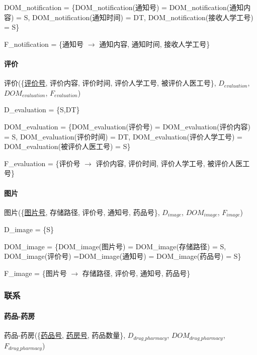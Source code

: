 \documentclass{article}
\begin{document}
DOM\_notification = \{DOM\_notification(通知号) = DOM\_notification(通知内容) = S, \newline DOM\_notification(通知时间) = DT, DOM\_notification(接收人学工号) = S\}

F\_notification = \{通知号 $\rightarrow$ 通知内容, 通知时间, 接收人学工号\}

\paragraph{评价}

评价(\{\underline{评价号}, 评价内容, 评价时间, 评价人学工号, 被评价人医工号\}, $D_{evaluation}$, \newline $DOM_{evaluation}$, $F_{evaluation}$)

D\_evaluation = \{S,DT\}

DOM\_evaluation = \{DOM\_evaluation(评价号) = DOM\_evaluation(评价内容) = S, \newline DOM\_evaluation(评价时间) = DT, DOM\_evaluation(评价人学工号) = DOM\_evaluation(被评价人医工号) = S\}

F\_evaluation = \{评价号 $\rightarrow$ 评价内容, 评价时间, 评价人学工号, 被评价人医工号\}

\paragraph{图片}

图片(\{\underline{图片号}, 存储路径, 评价号, 通知号, 药品号\}, $D_{image}$, $DOM_{image}$, $F_{image}$)

D\_image = \{S\}

DOM\_image = \{DOM\_image(图片号) = DOM\_image(存储路径) = S, DOM\_image(评价号) =\newline DOM\_image(通知号) = DOM\_image(药品号) = S\}

F\_image = \{图片号 $\rightarrow$ 存储路径, 评价号, 通知号, 药品号\}

\subsubsection{联系}

\paragraph{药品-药房}

药品-药房(\{\underline{药品号}, \underline{药房号}, 药品数量\}, $D_{drug\_pharmacy}$, $DOM_{drug\_pharmacy}$, $F_{drug\_pharmacy}$)
\end{document}
